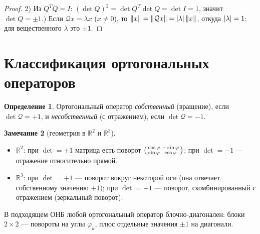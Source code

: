 \documentclass[11pt,a4paper]{article}
\theoremstyle{definition}
\newtheorem{definition}{Определение}[section]
\newtheorem{remark}[definition]{Замечание}
\theoremstyle{plain}
\newcommand{\R}{\mathbb{R}}
\DeclarePairedDelimiter{\abs}{\lvert}{\rvert}
\DeclarePairedDelimiter{\norm}{\lVert}{\rVert}
\begin{document}
\begin{proof}
2) Из $Q^{T}Q=I$: $(\det Q)^2=\det Q^{T}\det Q=\det I=1$, значит $\det Q=\pm1$.) Если $\mathcal Qx=\lambda x$ ($x\ne0$), то $\norm x=\norm{\mathcal Qx}=\abs\lambda\,\norm x$,
откуда $\abs\lambda=1$; для вещественного $\lambda$ это $\pm1$.
\end{proof}

\section{Классификация ортогональных операторов}

\begin{definition}
Ортогональный оператор \emph{собственный} (вращение), если $\det\mathcal Q=+1$, и
\emph{несобственный} (с отражением), если $\det\mathcal Q=-1$.
\end{definition}

\begin{remark}[геометрия в $\R^2$ и $\R^3$]
\begin{itemize}[leftmargin=*,nosep]
  \item $\R^2$: при $\det=+1$ матрица есть поворот
        $\begin{psmallmatrix}\cos\varphi&-\sin\varphi\\ \sin\varphi&\cos\varphi\end{psmallmatrix}$;
        при $\det=-1$ — отражение относительно прямой.
  \item $\R^3$: при $\det=+1$ — поворот вокруг некоторой оси (она отвечает собственному значению
        $+1$); при $\det=-1$ — поворот, скомбинированный с отражением (зеркальный поворот).
\end{itemize}
В подходящем ОНБ любой ортогональный оператор блочно-диагонален: блоки $2\times2$ — повороты на углы
$\varphi_k$, плюс отдельные значения $\pm1$ на диагонали.
\end{remark}
\end{document}
